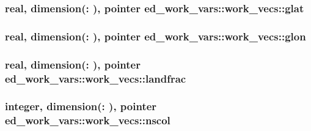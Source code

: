 \subsubsection[{\texorpdfstring{glat}{glat}}]{\setlength{\rightskip}{0pt plus 5cm}real, dimension(\+:  ), pointer ed\+\_\+work\+\_\+vars\+::work\+\_\+vecs\+::glat}\hypertarget{structed__work__vars_1_1work__vecs_a957e7ab559f48443828e710632887d48}{}\label{structed__work__vars_1_1work__vecs_a957e7ab559f48443828e710632887d48}
\subsubsection[{\texorpdfstring{glon}{glon}}]{\setlength{\rightskip}{0pt plus 5cm}real, dimension(\+:  ), pointer ed\+\_\+work\+\_\+vars\+::work\+\_\+vecs\+::glon}\hypertarget{structed__work__vars_1_1work__vecs_abee061861a4c4f6dfbc1bc8ec18a463b}{}\label{structed__work__vars_1_1work__vecs_abee061861a4c4f6dfbc1bc8ec18a463b}
\subsubsection[{\texorpdfstring{landfrac}{landfrac}}]{\setlength{\rightskip}{0pt plus 5cm}real, dimension(\+:  ), pointer ed\+\_\+work\+\_\+vars\+::work\+\_\+vecs\+::landfrac}\hypertarget{structed__work__vars_1_1work__vecs_a706bea04b2f0bd207bb88b24151b31f3}{}\label{structed__work__vars_1_1work__vecs_a706bea04b2f0bd207bb88b24151b31f3}
\subsubsection[{\texorpdfstring{nscol}{nscol}}]{\setlength{\rightskip}{0pt plus 5cm}integer, dimension(\+:  ), pointer ed\+\_\+work\+\_\+vars\+::work\+\_\+vecs\+::nscol}\hypertarget{structed__work__vars_1_1work__vecs_abcd125ac3a76abc44387395c1746d25b}{}\label{structed__work__vars_1_1work__vecs_abcd125ac3a76abc44387395c1746d25b}
